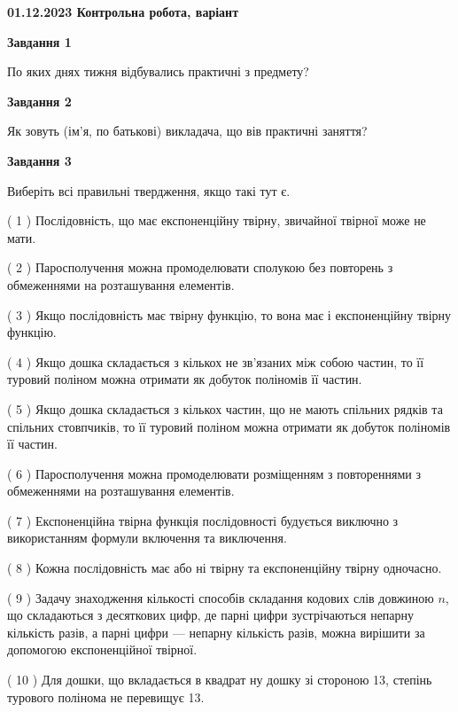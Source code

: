 \documentclass[12pt, ukrainian]{article}
\begin{document}
\begin {large}

\textbf{01.12.2023 Контрольна робота, варіант  }\par


{
{\begin {center}\textbf{Завдання 1}\end {center}}\par
По яких днях тижня відбувались практичні з предмету?\par
{\begin {center}\textbf{Завдання 2}\end {center}}\par
Як зовуть (ім'я, по батькові) викладача, що вів практичні заняття?\par
{\begin {center}\textbf{Завдання 3}\end {center}}\par
Виберіть всі правильні твердження, якщо такі тут є.\par
\vspace{2mm}
( 1 ) Послідовність, що має експоненційну твірну, звичайної твірної може не мати.%

( 2 ) Паросполучення можна промоделювати сполукою без повторень з обмеженнями на розташування елементів.%

( 3 ) Якщо послідовність має твірну функцію, то вона має і експоненційну твірну функцію.%

( 4 ) Якщо дошка складається з кількох не зв’язаних між собою частин, то її туровий поліном можна отримати як добуток поліномів її частин.%

( 5 ) Якщо дошка складається з кількох частин, що не мають спільних рядків та спільних стовпчиків, то її туровий поліном можна отримати як добуток поліномів її частин.%

( 6 ) Паросполучення можна промоделювати розміщенням з повтореннями з обмеженнями на розташування елементів.%

( 7 ) Експоненційна твірна функція послідовності будується виключно з використанням формули включення та виключення.%

( 8 ) Кожна послідовність має або ні твірну та експоненційну твірну одночасно.%

( 9 ) Задачу знаходження кількості способів складання кодових слів довжиною $n$, що складаються з десяткових цифр, де парні цифри зустрічаються непарну кількість разів, а парні цифри — непарну кількість разів, можна вирішити за допомогою експоненційної твірної.%

( 10 ) Для дошки, що вкладається в квадрат ну дошку зі стороною 13, степінь турового полінома не перевищує 13.%
}
\end {large}

\vspace{4mm}
\newpage
\end{document}
